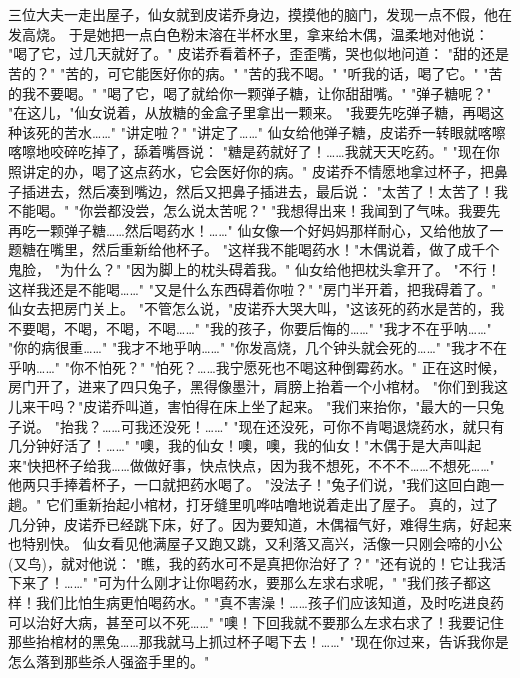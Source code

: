 \documentclass[12pt,UTF8]{ctexbook}
\begin{document}
\chapter{}

三位大夫一走出屋子，仙女就到皮诺乔身边，摸摸他的脑门，发现一点不假，他在发高烧。
于是她把一点白色粉末溶在半杯水里，拿来给木偶，温柔地对他说：
"喝了它，过几天就好了。"
皮诺乔看着杯子，歪歪嘴，哭也似地问道：
"甜的还是苦的？"
"苦的，可它能医好你的病。"
"苦的我不喝。"
"听我的话，喝了它。"
"苦的我不要喝。"
"喝了它，喝了就给你一颗弹子糖，让你甜甜嘴。"
"弹子糖呢？"
"在这儿，"仙女说着，从放糖的金盒子里拿出一颗来。
"我要先吃弹子糖，再喝这种该死的苦水……"
"讲定啦？"
"讲定了……"
仙女给他弹子糖，皮诺乔一转眼就喀嚓喀嚓地咬碎吃掉了，舔着嘴唇说：
"糖是药就好了！……我就天天吃药。"
"现在你照讲定的办，喝了这点药水，它会医好你的病。"
皮诺乔不情愿地拿过杯子，把鼻子插进去，然后凑到嘴边，然后又把鼻子插进去，最后说：
"太苦了！太苦了！我不能喝。"
"你尝都没尝，怎么说太苦呢？"
"我想得出来！我闻到了气味。我要先再吃一颗弹子糖……然后喝药水！……"
仙女像一个好妈妈那样耐心，又给他放了一题糖在嘴里，然后重新给他杯子。
"这样我不能喝药水！"木偶说着，做了成千个鬼脸，
"为什么？"
"因为脚上的枕头碍着我。"
仙女给他把枕头拿开了。
"不行！这样我还是不能喝……"
"又是什么东西碍着你啦？"
"房门半开着，把我碍着了。"
仙女去把房门关上。
"不管怎么说，"皮诺乔大哭大叫，"这该死的药水是苦的，我不要喝，不喝，不喝，不喝……"
"我的孩子，你要后悔的……"
"我才不在乎呐……"
"你的病很重……"
"我才不地乎呐……"
"你发高烧，几个钟头就会死的……"
"我才不在乎呐……"
"你不怕死？"
"怕死？……我宁愿死也不喝这种倒霉药水。"
正在这时候，房门开了，进来了四只兔子，黑得像墨汁，肩膀上抬着一个小棺材。
"你们到我这儿来干吗？"皮诺乔叫道，害怕得在床上坐了起来。
"我们来抬你，"最大的一只兔子说。
"抬我？……可我还没死！……"
"现在还没死，可你不肯喝退烧药水，就只有几分钟好活了！……"
"噢，我的仙女！噢，噢，我的仙女！"木偶于是大声叫起来"快把杯子给我……做做好事，快点快点，因为我不想死，不不不……不想死……"
他两只手捧着杯子，一口就把药水喝了。
"没法子！"兔子们说，"我们这回白跑一趟。"
它们重新抬起小棺材，打牙缝里叽哗咕噜地说着走出了屋子。
真的，过了几分钟，皮诺乔已经跳下床，好了。因为要知道，木偶福气好，难得生病，好起来也特别快。
仙女看见他满屋子又跑又跳，又利落又高兴，活像一只刚会啼的小公(又鸟)，就对他说：
"瞧，我的药水可不是真把你治好了？"
"还有说的！它让我活下来了！……"
"可为什么刚才让你喝药水，要那么左求右求呢，"
"我们孩子都这样！我们比怕生病更怕喝药水。"
"真不害澡！……孩子们应该知道，及时吃进良药可以治好大病，甚至可以不死……"
"噢！下回我就不要那么左求右求了！我要记住那些抬棺材的黑兔……那我就马上抓过杯子喝下去！……"
"现在你过来，告诉我你是怎么落到那些杀人强盗手里的。"
\end{document}
